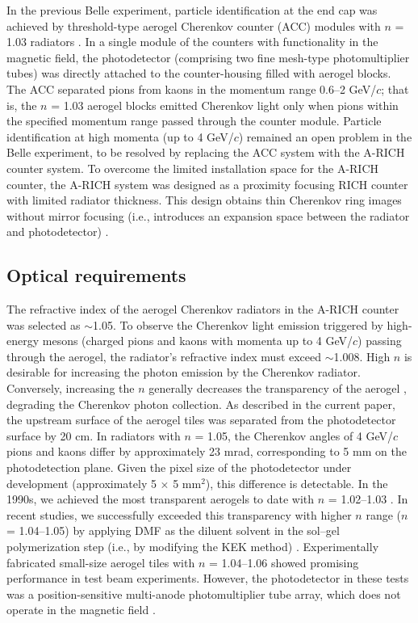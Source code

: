 \documentclass[5p,twocolumn]{elsarticle}
\begin{document}
In the previous Belle experiment, particle identification at the end cap was achieved by threshold-type aerogel Cherenkov counter (ACC) modules with $n$ = 1.03 radiators \cite{citeS4}. In a single module of the counters with functionality in the magnetic field, the photodetector (comprising two fine mesh-type photomultiplier tubes) was directly attached to the counter-housing filled with aerogel blocks. The ACC separated pions from kaons in the momentum range 0.6--2 GeV/$c$; that is, the $n$ = 1.03 aerogel blocks emitted Cherenkov light only when pions within the specified momentum range passed through the counter module. Particle identification at high momenta (up to 4 GeV/$c$) remained an open problem in the Belle experiment, to be resolved by replacing the ACC system with the A-RICH counter system. To overcome the limited installation space for the A-RICH counter, the A-RICH system was designed as a proximity focusing RICH counter with limited radiator thickness. This design obtains thin Cherenkov ring images without mirror focusing (i.e., introduces an expansion space between the radiator and photodetector) \cite{citeS5}.

\subsection{Optical requirements}
\label{s2}

The refractive index of the aerogel Cherenkov radiators in the A-RICH counter was selected as $\sim $1.05. To observe the Cherenkov light emission triggered by high-energy mesons (charged pions and kaons with momenta up to 4 GeV/$c$) passing through the aerogel, the radiator's refractive index must exceed $\sim $1.008. High $n$ is desirable for increasing the photon emission by the Cherenkov radiator. Conversely, increasing the $n$ generally decreases the transparency of the aerogel \cite{cite2}, degrading the Cherenkov photon collection. As described in the current paper, the upstream surface of the aerogel tiles was separated from the photodetector surface by 20 cm. In radiators with $n$ = 1.05, the Cherenkov angles of 4 GeV/$c$ pions and kaons differ by approximately 23 mrad, corresponding to 5 mm on the photodetection plane. Given the pixel size of the photodetector under development (approximately 5 $\times $ 5 mm$^2$), this difference is detectable. In the 1990s, we achieved the most transparent aerogels to date with $n$ = 1.02--1.03 \cite{cite10,cite11}. In recent studies, we successfully exceeded this transparency with higher $n$ range ($n$ = 1.04--1.05) by applying DMF as the diluent solvent in the sol--gel polymerization step (i.e., by modifying the KEK method) \cite{cite2,cite9,cite10}. Experimentally fabricated small-size aerogel tiles with $n$ = 1.04--1.06 showed promising performance in test beam experiments. However, the photodetector in these tests was a position-sensitive multi-anode photomultiplier tube array, which does not operate in the magnetic field \cite{citeS6,citeS7}.
\end{document}
